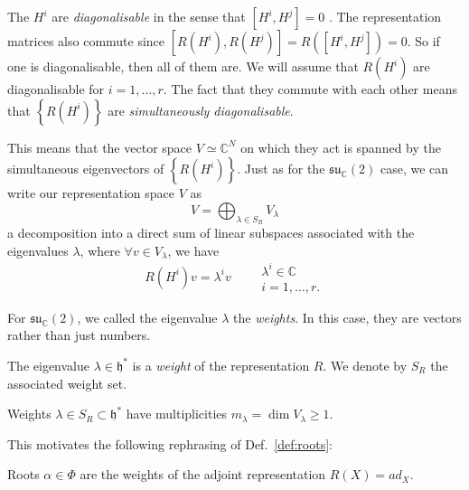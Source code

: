 The $H^i$ are  \emph{diagonalisable} in the sense that $[H^i, H^{j}] = 0$ . The representation matrices also commute since $ [R(H^{i}), R(H^{j})] = R([H^{i}, H^{j}]) = 0$. So if one is diagonalisable, then all of them are.
We will assume that $R(H^i)$  are diagonalisable for $i = 1, \dots, r$.
The fact that they commute with each other means that $\left\{ R(H^{i}) \right\}$ are \emph{simultaneously diagonalisable}.

This means that the vector space $V \simeq \mathbb{C}^N$ on which they act is spanned by the simultaneous eigenvectors of $\left\{ R(H^i) \right\}$.
Just as for the  $\mathfrak{su}_{\mathbb{C}}(2)$ case, we can write our representation space $V$ as
 \begin{equation}
  V = \bigoplus_{\lambda \in S_R} V_{\lambda}
\end{equation}
a decomposition into a direct sum of linear subspaces associated with the eigenvalues $\lambda$, where $\forall v \in V_\lambda$, we have
\begin{equation}
  R(H^{i}) v = \lambda^{i} v \qquad 
  \begin{gathered}
    \lambda^{i} \in \mathbb{C} \\
    i = 1, \dots, r.
  \end{gathered}
\end{equation}

For $\mathfrak{su}_{\mathbb{C}}(2)$, we called the eigenvalue $\lambda$ the  \emph{weights}. In this case, they are vectors rather than just numbers.

\begin{definition}[]
  The eigenvalue $\lambda \in \mathfrak{h}^*$ is a \emph{weight} of the representation $R$. We denote by $S_R$ the associated weight set.
\end{definition}

\begin{remark}
  Weights $\lambda \in S_R \subset \mathfrak{h}^*$ have multiplicities $m_{\lambda} = \dim V_{\lambda} \geq 1$.
\end{remark}

This motivates the following rephrasing of Def.~\ref{def:roots}:
\begin{definition}[]
  Roots $\alpha \in \Phi$ are the weights of the adjoint representation $R(X) = ad_X$.
\end{definition}

